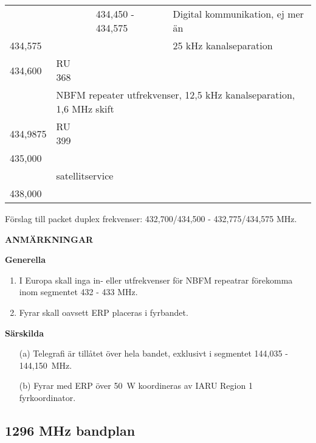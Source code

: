 \begin{longtable}{llll}
        &            & 434,450 - 434,575 & Digital kommunikation, ej mer än \\
434,575 &            &                   & 25 kHz kanalseparation \\
434,600 & RU 368 & & \\
        & \multicolumn{3}{l}{NBFM repeater utfrekvenser, 12,5 kHz kanalseparation, 1,6 MHz skift} \\
434,9875 & RU 399 & & \\
435,000 & & & \\
        & \multicolumn{3}{l}{satellitservice} \\
438,000 & & & \\
\end{longtable}

Förslag till packet duplex frekvenser: 432,700/434,500 - 432,775/434,575 MHz.

\textbf{ANMÄRKNINGAR}

\textbf{Generella}

\begin{enumerate}[label=\alph*.]
\item I Europa skall inga in- eller utfrekvenser för NBFM repeatrar
  förekomma inom segmentet 432 - 433 MHz.
\item Fyrar skall oavsett ERP placeras i fyrbandet.
\end{enumerate}

\textbf{Särskilda}

\begin{itemize}
\item[(a)] Telegrafi är tillåtet över hela bandet, exklusivt i segmentet
  144,035 - 144,150~MHz.
\item[(b)] Fyrar med ERP över 50~W koordineras av IARU Region 1 fyrkoordinator.
\end{itemize}

\subsection{1296 MHz bandplan}

